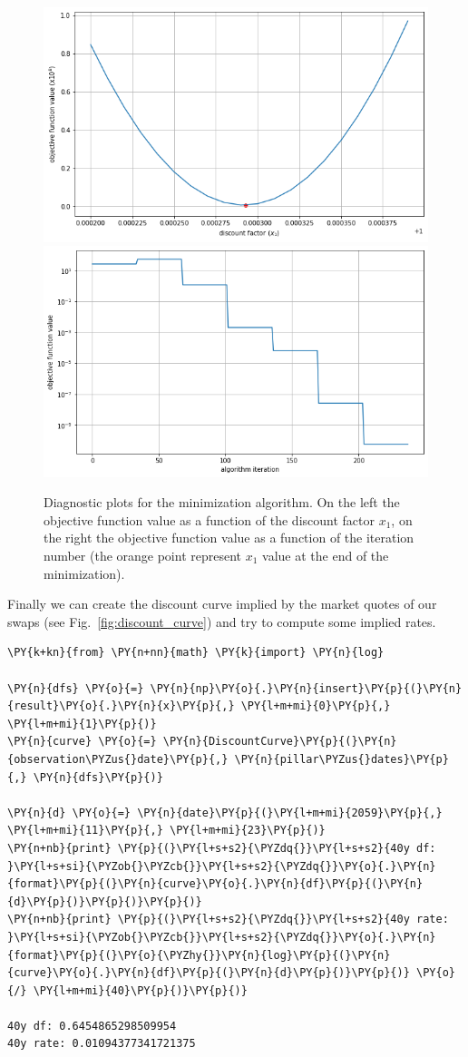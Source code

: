 \begin{figure}[htb]
	\centering
	\includegraphics[width=0.45\linewidth]{figures/obj_func.png}
	\includegraphics[width=0.45\linewidth]{figures/obj_func_iter.png}
	\caption{Diagnostic plots for the minimization algorithm. On the left the objective function value as a function of the discount factor $x_1$, on the right the objective function value as a function of the iteration number (the orange point represent $x_1$ value at the end of the minimization).}
	\label{fig:minimization_diagnostic}
\end{figure}

Finally we can create the discount curve implied by the market quotes of
our swaps (see Fig.~\ref{fig:discount_curve}) and try to compute some implied rates.

\begin{tcolorbox}[breakable, size=fbox, boxrule=1pt, pad at break*=1mm,colback=cellbackground, colframe=cellborder]
\begin{Verbatim}[commandchars=\\\{\}]
\PY{k+kn}{from} \PY{n+nn}{math} \PY{k}{import} \PY{n}{log}
	
\PY{n}{dfs} \PY{o}{=} \PY{n}{np}\PY{o}{.}\PY{n}{insert}\PY{p}{(}\PY{n}{result}\PY{o}{.}\PY{n}{x}\PY{p}{,} \PY{l+m+mi}{0}\PY{p}{,} \PY{l+m+mi}{1}\PY{p}{)}
\PY{n}{curve} \PY{o}{=} \PY{n}{DiscountCurve}\PY{p}{(}\PY{n}{observation\PYZus{}date}\PY{p}{,} \PY{n}{pillar\PYZus{}dates}\PY{p}{,} \PY{n}{dfs}\PY{p}{)}
	
\PY{n}{d} \PY{o}{=} \PY{n}{date}\PY{p}{(}\PY{l+m+mi}{2059}\PY{p}{,} \PY{l+m+mi}{11}\PY{p}{,} \PY{l+m+mi}{23}\PY{p}{)}
\PY{n+nb}{print} \PY{p}{(}\PY{l+s+s2}{\PYZdq{}}\PY{l+s+s2}{40y df: }\PY{l+s+si}{\PYZob{}\PYZcb{}}\PY{l+s+s2}{\PYZdq{}}\PY{o}{.}\PY{n}{format}\PY{p}{(}\PY{n}{curve}\PY{o}{.}\PY{n}{df}\PY{p}{(}\PY{n}{d}\PY{p}{)}\PY{p}{)}\PY{p}{)}
\PY{n+nb}{print} \PY{p}{(}\PY{l+s+s2}{\PYZdq{}}\PY{l+s+s2}{40y rate: }\PY{l+s+si}{\PYZob{}\PYZcb{}}\PY{l+s+s2}{\PYZdq{}}\PY{o}{.}\PY{n}{format}\PY{p}{(}\PY{o}{\PYZhy{}}\PY{n}{log}\PY{p}{(}\PY{n}{curve}\PY{o}{.}\PY{n}{df}\PY{p}{(}\PY{n}{d}\PY{p}{)}\PY{p}{)} \PY{o}{/} \PY{l+m+mi}{40}\PY{p}{)}\PY{p}{)}             
	
40y df: 0.6454865298509954
40y rate: 0.01094377341721375
\end{Verbatim}
\end{tcolorbox}

